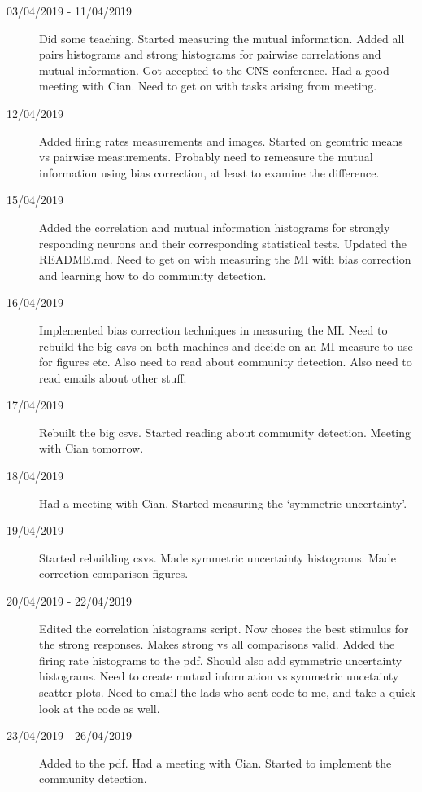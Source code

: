 \documentclass[a4paper,12pt]{article}
\theoremstyle{definition}
\begin{document}
\begin{description}
	\item[03/04/2019 - 11/04/2019] Did some teaching. Started measuring the mutual information. Added all pairs histograms and strong histograms for pairwise correlations and mutual information. Got accepted to the CNS conference. Had a good meeting with Cian. Need to get on with tasks arising from meeting.

	\item[12/04/2019] Added firing rates measurements and images. Started on geomtric means vs pairwise measurements. Probably need to remeasure the mutual information using bias correction, at least to examine the difference.

	\item[15/04/2019] Added the correlation and mutual information histograms for strongly responding neurons and their corresponding statistical tests. Updated the \\ README.md. Need to get on with measuring the MI with bias correction and learning how to do community detection.

	\item[16/04/2019] Implemented bias correction techniques in measuring the MI. Need to rebuild the big csvs on both machines and decide on an MI measure to use for figures etc. Also need to read about community detection. Also need to read emails about other stuff.

	\item[17/04/2019] Rebuilt the big csvs. Started reading about community detection. Meeting with Cian tomorrow.

	\item[18/04/2019] Had a meeting with Cian. Started measuring the `symmetric uncertainty'.

	\item[19/04/2019] Started rebuilding csvs. Made symmetric uncertainty histograms. Made correction comparison figures.

	\item[20/04/2019 - 22/04/2019] Edited the correlation histograms script. Now choses the best stimulus for the strong responses. Makes strong vs all comparisons valid. Added the firing rate histograms to the pdf. Should also add symmetric uncertainty histograms. Need to create mutual information vs symmetric uncetainty scatter plots. Need to email the lads who sent code to me, and take a quick look at the code as well.

	\item[23/04/2019 - 26/04/2019] Added to the pdf. Had a meeting with Cian. Started to implement the community detection.


\end{description}
\end{document}
